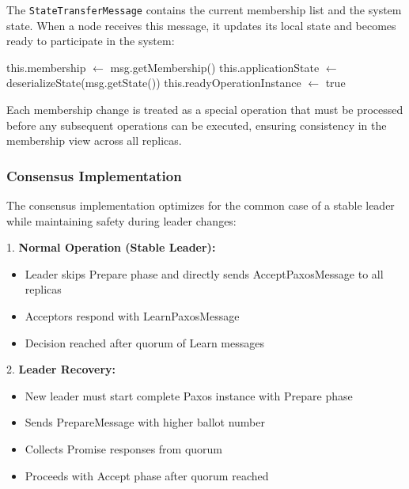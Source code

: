 \documentclass[10pt,a4paper,twocolumn]{article}
\begin{document}
The \texttt{StateTransferMessage} contains the current membership list and the system state. When a node receives this message, it updates its local state and becomes ready to participate in the system:

\begin{algorithm}[H]
	\begin{algorithmic}
		\State this.membership $\leftarrow$ msg.getMembership()
		\State this.applicationState $\leftarrow$ deserializeState(msg.getState())
		\State this.readyOperationInstance $\leftarrow$ true
		\EndIf
		\EndUpon
	\end{algorithmic}
\end{algorithm}

Each membership change is treated as a special operation that must be processed before any subsequent operations can be executed, ensuring consistency in the membership view across all replicas.


\subsubsection{Consensus Implementation}
The consensus implementation optimizes for the common case of a stable leader while maintaining safety during leader changes:

1. \textbf{Normal Operation (Stable Leader):}
   \begin{itemize}
    	\setlength\itemsep{0em}
   \item Leader skips Prepare phase and directly sends AcceptPaxosMessage to all replicas
   \item Acceptors respond with LearnPaxosMessage
   \item Decision reached after quorum of Learn messages
   \end{itemize}

2. \textbf{Leader Recovery:}
   \begin{itemize}
    	\setlength\itemsep{0em}
   \item New leader must start complete Paxos instance with Prepare phase
   \item Sends PrepareMessage with higher ballot number
   \item Collects Promise responses from quorum
   \item Proceeds with Accept phase after quorum reached
   \end{itemize}
\end{document}
